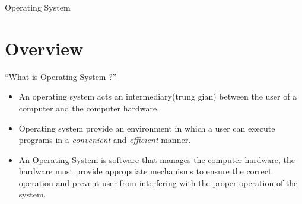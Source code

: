 \documentclass[10pt]{article}
\newcommand{\quotes}[1]{``#1''}
\begin{document}
\begin{center}
\huge Operating System
\end{center}

\section{Overview}

\quotes{What is Operating System ?}
\begin{itemize}
	\item An operating system acts an intermediary(trung gian) between the user of a computer and the computer hardware.
	\item Operating system provide an environment in which a user can execute programs in a \textit{convenient} and \textit{efficient} manner.
	\item An Operating System is software that manages the computer hardware, the hardware must provide appropriate mechanisms to ensure the correct operation and prevent user from interfering with the proper operation of the system.
\end{itemize}
\end{document}
